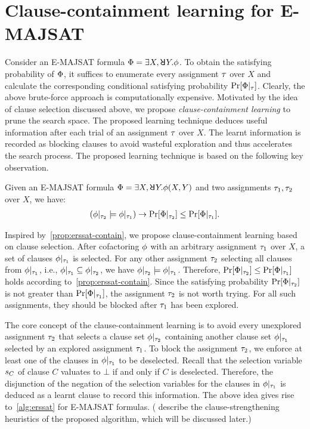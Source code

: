 \section{Clause-containment learning for E-MAJSAT}
\label{sect:erssat-technique}

Consider an E-MAJSAT formula $\Qf = \exists X,\random{} Y.\pf$.
To obtain the satisfying probability of $\Phi$,
it suffices to enumerate every assignment $\tau$ over $X$ and calculate the corresponding conditional satisfying probability $\Pr[\Phi|_{\tau}]$.
Clearly, the above brute-force approach is computationally expensive.
Motivated by the idea of clause selection discussed above,
we propose \textit{clause-containment learning} to prune the search space.
The proposed learning technique deduces useful information after each trial of an assignment $\tau$ over $X$.
The learnt information is recorded as blocking clauses to avoid wasteful exploration and thus accelerates the search process.
The proposed learning technique is based on the following key observation.

\begin{proposition}
    \label{prop:erssat-contain}
    Given an E-MAJSAT formula $\Qf=\exists X,\random{} Y.\pf(X,Y)$ and two assignments $\tau_1,\tau_2$ over $X$,
    we have:
    \begin{align*}
        (\phi|_{\tau_2}\models\phi|_{\tau_1})\rightarrow\Pr[\Phi|_{\tau_2}]\leq\Pr[\Phi|_{\tau_1}].
    \end{align*}
\end{proposition}

Inspired by~\cref{prop:erssat-contain},
we propose clause-containment learning based on clause selection.
After cofactoring $\phi$ with an arbitrary assignment $\tau_1$ over $X$,
a set of clauses $\phi|_{\tau_1}$ is selected.
For any other assignment $\tau_2$ selecting all clauses from $\phi|_{\tau_1}$,
i.e., $\phi|_{\tau_1}\subseteq\phi|_{\tau_2}$,
we have $\phi|_{\tau_2} \models \phi|_{\tau_1}$.
Therefore, $\Pr[\Phi|_{\tau_2}]\leq\Pr[\Phi|_{\tau_1}]$ holds according to~\cref{prop:erssat-contain}.
Since the satisfying probability $\Pr[\Phi|_{\tau_2}]$ is not greater than $\Pr[\Phi|_{\tau_1}]$,
the assignment $\tau_2$ is not worth trying.
For all such assignments,
they should be blocked after $\tau_1$ has been explored.

The core concept of the clause-containment learning is to avoid every unexplored assignment $\tau_2$ that selects a clause set $\phi|_{\tau_2}$ containing another clause set $\phi|_{\tau_1}$ selected by an explored assignment $\tau_1$.
To block the assignment $\tau_2$,
we enforce at least one of the clauses in $\phi|_{\tau_1}$ to be deselected.
Recall that the selection variable $s_{C}$ of clause $C$ valuates to $\bot$ if and only if $C$ is deselected.
Therefore, the disjunction of the negation of the selection variables for the clauses in $\phi|_{\tau_1}$ is deduced as a learnt clause to record this information.
The above idea gives rise to~\cref{alg:erssat} for E-MAJSAT formulas.
( describe the clause-strengthening heuristics of the proposed algorithm, which will be discussed later.)

